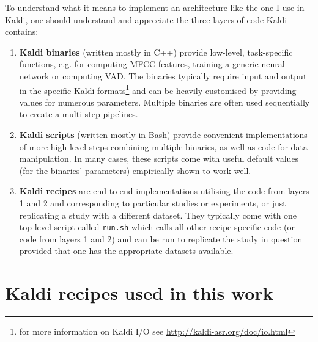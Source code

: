 \documentclass[bsc,frontabs,twoside,singlespacing,parskip,deptreport]{infthesis}
\begin{document}
{{    %
    To understand what it means to implement an architecture like the one I use in Kaldi, one should understand and appreciate the three layers of code Kaldi contains:
    \begin{enumerate}
      \item {\textbf{Kaldi binaries} (written mostly in C++) provide low-level, task-specific functions, e.g. for computing MFCC features, training a generic neural network or computing VAD. The binaries typically require input and output in the specific Kaldi formats\footnote{for more information on Kaldi I/O see \url{http://kaldi-asr.org/doc/io.html}} and can be heavily customised by providing values for numerous parameters. Multiple binaries are often used sequentially to create a multi-step pipelines.}
      \item {\textbf{Kaldi scripts} (written mostly in Bash) provide convenient implementations of more high-level steps combining multiple binaries, as well as code for data manipulation. In many cases, these scripts come with useful default values (for the binaries' parameters) empirically shown to work well.}
      \item {\textbf{Kaldi recipes} are end-to-end implementations utilising the code from layers 1 and 2 and corresponding to particular studies or experiments, or just replicating a study with a different dataset. They typically come with one top-level script called \texttt{run.sh} which calls all other recipe-specific code (or code from layers 1 and 2) and can be run to replicate the study in question provided that one has the appropriate datasets available.}
    \end{enumerate}
  }

  \section{Kaldi recipes used in this work}{
    \label{sec:recipes}

}}
\end{document}
